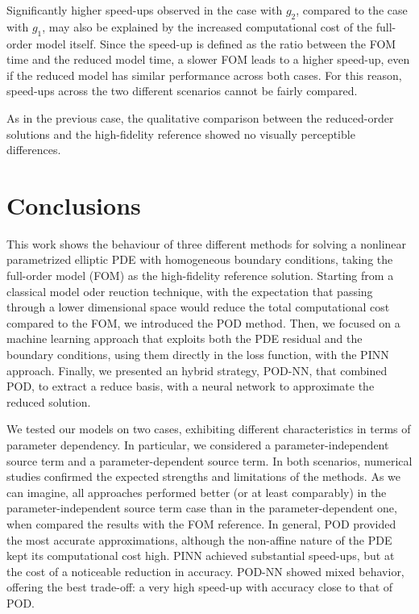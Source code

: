 \documentclass[
    conference,
    nofonttune,
    11pt
]{IEEEtran}
\begin{document}
            Significantly higher speed-ups observed in the case with $g_2$, compared to the case with $g_1$, may also be explained by the increased computational cost of the full-order model itself. Since the speed-up is defined as the ratio between the FOM time and the reduced model time, a slower FOM leads to a higher speed-up, even if the reduced model has similar performance across both cases. For this reason, speed-ups across the two different scenarios cannot be fairly compared.

            As in the previous case, the qualitative comparison between the reduced-order solutions and the high-fidelity reference showed no visually perceptible differences.

%

    \section{Conclusions}\label{seConclusion}

        This work shows the behaviour of three different methods for solving a nonlinear parametrized elliptic PDE with homogeneous boundary conditions, taking the full-order model (FOM) as the high-fidelity reference solution. Starting from a classical model oder reuction technique, with the expectation that passing through a lower dimensional space would reduce the total computational cost compared to the FOM, we introduced the POD method. Then, we focused on a machine learning approach that exploits both the PDE residual and the boundary conditions, using them directly in the loss function, with the PINN approach. Finally, we presented an hybrid strategy, POD-NN, that combined POD, to extract a reduce basis, with a neural network to approximate the reduced solution. 

        We tested our models on two cases, exhibiting different characteristics in terms of parameter dependency. In particular, we considered a parameter-independent source term and a parameter-dependent source term. In both scenarios, numerical studies confirmed the expected strengths and limitations of the methods.
        As we can imagine, all approaches performed better (or at least comparably) in the parameter-independent source term case than in the parameter-dependent one, when compared the results with the FOM reference. In general, POD provided the most accurate approximations, although the non-affine nature of the PDE kept its computational cost high. PINN achieved substantial speed-ups, but at the cost of a noticeable reduction in accuracy. POD-NN showed mixed behavior, offering the best trade-off: a very high speed-up with accuracy close to that of POD.
\end{document}
